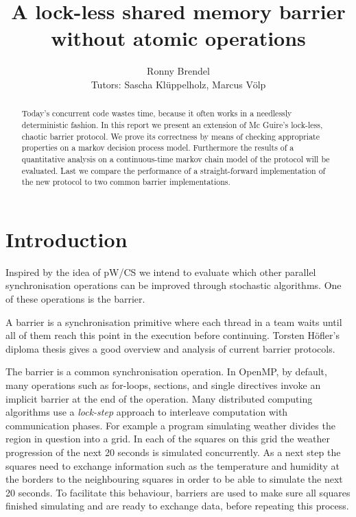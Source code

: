 \documentclass[a4paper, 10pt]{article}
\title{A lock-less shared memory barrier without atomic operations}
\author{Ronny Brendel\\Tutors: Sascha Kl\"uppelholz, Marcus V\"olp}
\begin{document}
\maketitle

\begin{abstract}
Today's concurrent code wastes time, because it often works in a needlessly deterministic fashion. In this report we present an extension of Mc Guire's lock-less, chaotic barrier protocol. We prove its correctness by means of checking appropriate properties on a markov decision process model. Furthermore the results of a quantitative analysis on a continuous-time markov chain model of the protocol will be evaluated. Last we compare the performance of a straight-forward implementation of the new protocol to two common barrier implementations.
\end{abstract}

\section{Introduction}
Inspired by the idea of pW/CS\cite{pwcs} we intend to evaluate which other parallel synchronisation operations can be improved through stochastic algorithms. One of these operations is the barrier.

A barrier is a synchronisation primitive where each thread in a team waits until all of them reach this point in the execution before continuing. Torsten H\"ofler's diploma thesis\cite{hoefler2005} gives a good overview and analysis of current barrier protocols.

The barrier is a common synchronisation operation. In OpenMP\cite{omp}, by default, many operations such as for-loops, sections, and single directives invoke an implicit barrier at the end of the operation. Many distributed computing algorithms use a \emph{lock-step} approach to interleave computation with communication phases. For example a program simulating weather divides the region in question into a grid. In each of the squares on this grid the weather progression of the next 20 seconds is simulated concurrently. As a next step the squares need to exchange information such as the temperature and humidity at the borders to the neighbouring squares in order to be able to simulate the next 20 seconds. To facilitate this behaviour, barriers are used to make sure all squares finished simulating and are ready to exchange data, before repeating this process.
\end{document}
